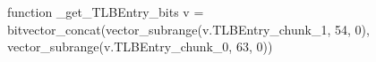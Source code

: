 function _get_TLBEntry_bits v = bitvector_concat(vector_subrange(v.TLBEntry_chunk_1, 54, 0), vector_subrange(v.TLBEntry_chunk_0, 63, 0))
